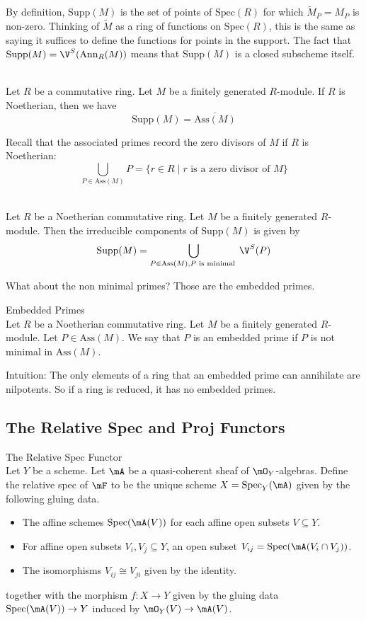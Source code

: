 \documentclass[a4paper]{article}
\begin{document}
By definition, $\text{Supp}(M)$ is the set of points of $\text{Spec}(R)$ for which $\widetilde{M}_P=M_P$ is non-zero. Thinking of $\widetilde{M}$ as a ring of functions on $\text{Spec}(R)$, this is the same as saying it suffices to define the functions for points in the support. The fact that $\text{Supp}(M)=\V^S(\text{Ann}_R(M))$ means that $\text{Supp}(M)$ is a closed subscheme itself. 

\begin{prp}{}{}\\
Let $R$ be a commutative ring. Let $M$ be a finitely generated $R$-module. If $R$ is Noetherian, then we have $$\text{Supp}(M)=\overline{\text{Ass}(M)}$$
\end{prp}

Recall that the associated primes record the zero divisors of $M$ if $R$ is Noetherian: $$\bigcup_{P\in\text{Ass}(M)}P=\{r\in R\;|\;r\text{ is a zero divisor of }M\}$$

\begin{prp}{}{}\\
Let $R$ be a Noetherian commutative ring. Let $M$ be a finitely generated $R$-module. Then the irreducible components of $\text{Supp}(M)$ is given by $$\text{Supp}(M)=\bigcup_{P\in\text{Ass}(M),P\text{ is minimal }}\V^S(P)$$
\end{prp}

What about the non minimal primes? Those are the embedded primes. 

\begin{defn}{Embedded Primes}{}\\
Let $R$ be a Noetherian commutative ring. Let $M$ be a finitely generated $R$-module. Let $P\in\text{Ass}(M)$. We say that $P$ is an embedded prime if $P$ is not minimal in $\text{Ass}(M)$. 
\end{defn}

Intuition: The only elements of a ring that an embedded prime can annihilate are nilpotents. So if a ring is reduced, it has no embedded primes. 

\subsection{The Relative Spec and Proj Functors}
\begin{defn}{The Relative Spec Functor}{}\\
Let $Y$ be a scheme. Let $\mA$ be a quasi-coherent sheaf of $\mO_Y$-algebras. Define the relative spec of $\mF$ to be the unique scheme $X=\text{Spec}_Y(\mA)$ given by the following gluing data. 
\begin{itemize}
\item The affine schemes $\text{Spec}(\mA(V))$ for each affine open subsets $V\subseteq Y$. 
\item For affine open subsets $V_i,V_j\subseteq Y$, an open subset $V_{ij}=\text{Spec}(\mA(V_i\cap V_j))$. 
\item The isomorphisms $V_{ij}\cong V_{ji}$ given by the identity. 
\end{itemize}
together with the morphism $f:X\to Y$ given by the gluing data $\text{Spec}(\mA(V))\to Y$ induced by $\mO_Y(V)\to\mA(V)$. 
\end{defn}
\end{document}
